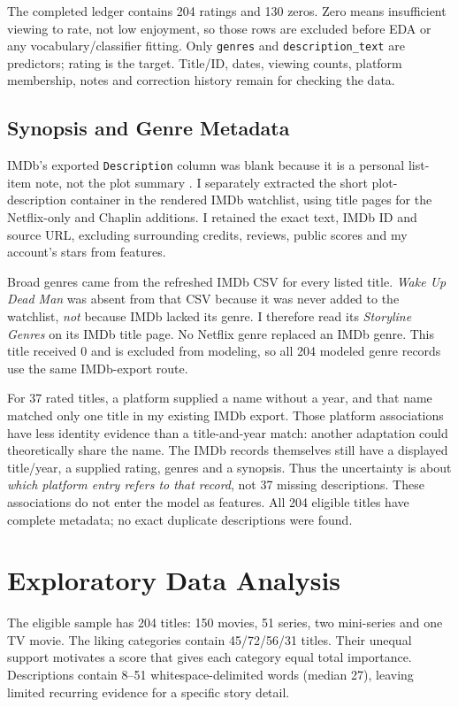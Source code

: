 \documentclass[11pt,letterpaper]{article}
\begin{document}
The completed ledger contains 204 ratings and 130 zeros. Zero means insufficient viewing to rate, not low enjoyment, so those rows are excluded before EDA or any vocabulary/classifier fitting. Only \texttt{genres} and \texttt{description\_text} are predictors; rating is the target. Title/ID, dates, viewing counts, platform membership, notes and correction history remain for checking the data.

\subsection{Synopsis and Genre Metadata}
IMDb's exported \texttt{Description} column was blank because it is a personal list-item note, not the plot summary \cite{imdblists}. I separately extracted the short plot-description container in the rendered IMDb watchlist, using title pages for the Netflix-only and Chaplin additions. I retained the exact text, IMDb ID and source URL, excluding surrounding credits, reviews, public scores and my account's stars from features.

Broad genres came from the refreshed IMDb CSV for every listed title. \emph{Wake Up Dead Man} was absent from that CSV because it was never added to the watchlist, \emph{not} because IMDb lacked its genre. I therefore read its \emph{Storyline Genres} on its IMDb title page. No Netflix genre replaced an IMDb genre. This title received 0 and is excluded from modeling, so all 204 modeled genre records use the same IMDb-export route.

For 37 rated titles, a platform supplied a name without a year, and that name matched only one title in my existing IMDb export. Those platform associations have less identity evidence than a title-and-year match: another adaptation could theoretically share the name. The IMDb records themselves still have a displayed title/year, a supplied rating, genres and a synopsis. Thus the uncertainty is about \emph{which platform entry refers to that record}, not 37 missing descriptions. These associations do not enter the model as features. All 204 eligible titles have complete metadata; no exact duplicate descriptions were found.

\FloatBarrier
\section{Exploratory Data Analysis}

The eligible sample has 204 titles: 150 movies, 51 series, two mini-series and one TV movie. The liking categories contain 45/72/56/31 titles. Their unequal support motivates a score that gives each category equal total importance. Descriptions contain 8--51 whitespace-delimited words (median 27), leaving limited recurring evidence for a specific story detail.
\end{document}
